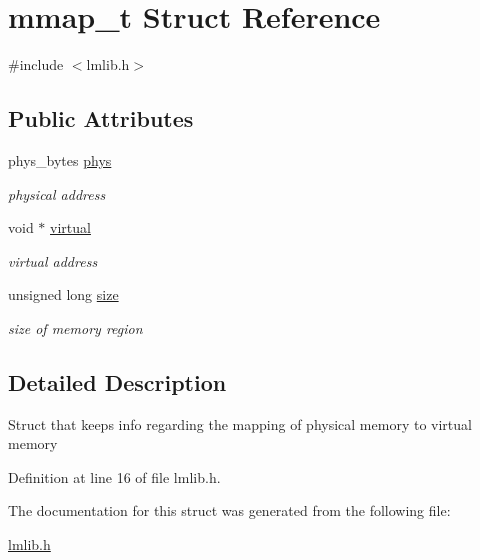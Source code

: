 \hypertarget{structmmap__t}{}\section{mmap\+\_\+t Struct Reference}
\label{structmmap__t}


{\ttfamily \#include $<$lmlib.\+h$>$}

\subsection*{Public Attributes}
\begin{DoxyCompactItemize}
\item 
phys\+\_\+bytes \hyperlink{group__lmlib_gaa6ac1ee0e0fadea4a4f85b48c8359ae4}{phys}
\begin{DoxyCompactList}\small\item\em physical address \end{DoxyCompactList}\item 
void $\ast$ \hyperlink{group__lmlib_ga4de93144fb3ffbceb9bd1f3009d6d98c}{virtual}
\begin{DoxyCompactList}\small\item\em virtual address \end{DoxyCompactList}\item 
unsigned long \hyperlink{group__lmlib_gaf1cdc5384a402fddf33f400a5e1e5e45}{size}
\begin{DoxyCompactList}\small\item\em size of memory region \end{DoxyCompactList}\end{DoxyCompactItemize}


\subsection{Detailed Description}
Struct that keeps info regarding the mapping of physical memory to virtual memory 

Definition at line 16 of file lmlib.\+h.



The documentation for this struct was generated from the following file\+:\begin{DoxyCompactItemize}
\item 
\hyperlink{lmlib_8h}{lmlib.\+h}\end{DoxyCompactItemize}
